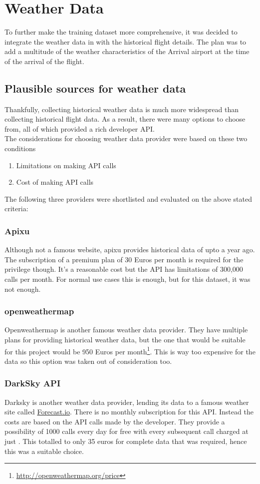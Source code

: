 \chapter{Weather Data}
To further make the training dataset more comprehensive, it was decided to integrate the weather data in with the historical flight details. The plan was to add a multitude of the weather characteristics of the Arrival airport at the time of the arrival of the flight.

\section{Plausible sources for weather data}
Thankfully, collecting historical weather data is much more widespread than collecting historical flight data. As a result, there were many options to choose from, all of which provided a rich developer API.
\\The considerations for choosing weather data provider were based on these two conditions
\begin{enumerate}
    \item Limitations on making API calls
    \item Cost of making API calls
\end{enumerate}
The following three providers were shortlisted and evaluated on the above stated criteria:

\subsection{Apixu}
Although not a famous website, apixu provides historical data of upto a year ago. The subscription of a premium plan of 30 Euros per month is required for the privilege though. It's a reasonable cost but the API has limitations of 300,000 calls per month. For normal use cases this is enough, but for this dataset, it was not enough.

\subsection{openweathermap}
Openweathermap is another famous weather data provider. They have multiple plans for providing historical weather data, but the one that would be suitable for this project would be 950 Euros per month\footnote{\url{http://openweathermap.org/price}}. This is way too expensive for the data so this option was taken out of consideration too.

\subsection{DarkSky API}
Darksky is another weather data provider, lending its data to a famous weather site called \url{Forecast.io}. There is no monthly subscription for this API. Instead the costs are based on the API calls made by the developer. They provide a possibility of 1000 calls every day for free with every subsequent call charged at just . This totalled to only 35 euros for complete data that was required, hence this was a suitable choice. 

